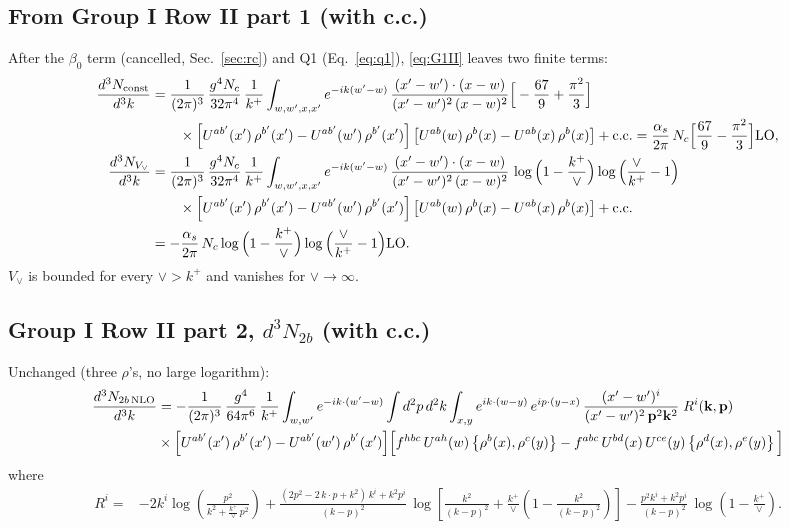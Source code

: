 \documentclass[10pt]{article}
\numberwithin{equation}{section}
\newcommand{\LO}{{\rm LO}}
\begin{document}
\subsection{From Group I Row II part 1 (with c.c.)}
After the $\beta_0$ term (cancelled, Sec.~\ref{sec:rc}) and Q1 (Eq.~\eqref{eq:q1}), \eqref{eq:G1II} leaves two finite terms:
\begin{align}
\frac{d^3N_{\rm const}}{d^3k}&=\frac{1}{(2\pi)^{3}}\,\frac{g^{4}N_{c}}{32\pi^{4}}\,\frac{1}{k^{+}}\int_{w,w',x,x'}e^{-ik(w'-w)}\,\frac{(x'-w')\cdot (x-w)}{(x'-w')^{2}\,(x-w)^{2}}\Big[-\frac{67}{9}+\frac{\pi^{2}}{3}\Big]\notag\\
&\qquad\times\left[U^{ab'}(x')\,\rho^{b'}(x') - U^{ab'}(w')\,\rho^{b'}(x')\right]\left[U^{ab}(w)\,\rho^{b}(x) - U^{ab}(x)\,\rho^{b}(x)\right]+{\rm c.c.}=\frac{\alpha_s}{2\pi}\,N_c\Big[\frac{67}{9}-\frac{\pi^2}{3}\Big]\LO,\label{eq:const}\\
\frac{d^3N_{V_\vee}}{d^3k}&=\frac{1}{(2\pi)^{3}}\,\frac{g^{4}N_{c}}{32\pi^{4}}\,\frac{1}{k^{+}}\int_{w,w',x,x'}e^{-ik(w'-w)}\,\frac{(x'-w')\cdot (x-w)}{(x'-w')^{2}\,(x-w)^{2}}\,\log\Big(1-\frac{k^{+}}{\vee}\Big)\log\Big(\frac{\vee}{k^{+}}-1\Big)\notag\\
&\qquad\times\left[U^{ab'}(x')\,\rho^{b'}(x') - U^{ab'}(w')\,\rho^{b'}(x')\right]\left[U^{ab}(w)\,\rho^{b}(x) - U^{ab}(x)\,\rho^{b}(x)\right]+{\rm c.c.}\notag\\
&=-\frac{\alpha_s}{2\pi}\,N_c\log\Big(1-\frac{k^+}{\vee}\Big)\log\Big(\frac{\vee}{k^+}-1\Big)\LO.\label{eq:Vvee}
\end{align}
$V_\vee$ is bounded for every $\vee>k^+$ and vanishes for $\vee\to\infty$.

\subsection{Group I Row II part 2, $d^3N_{2b}$ (with c.c.)}\label{sub:first}
Unchanged (three $\rho$'s, no large logarithm):
\begin{align}
\frac{d^{3}N_{2b\,\rm NLO}}{d^{3}k} & = -\frac{1}{(2\pi)^{3}}\,\frac{g^{4}}{64\pi^{6}}\,\frac{1}{k^{+}}\int_{w,w'} e^{-ik\cdot(w'-w)}
\int d^{2}p\,d^{2}k\int_{x,y} e^{ik\cdot(w-y)}\,e^{ip\cdot(y-x)}\,\frac{(x'-w')^{i}}{(x'-w')^{2}\,\mathbf{p}^{2}\mathbf{k}^{2}}\;R^{i}(\mathbf{k},\mathbf{p})\notag\\
&\times\Big[U^{ab'}(x')\,\rho^{b'}(x')-U^{ab'}(w')\,\rho^{b'}(x')\Big]
\Big[f^{hbc}\,U^{ah}(w)\left\{\rho^{b}(x),\rho^{c}(y)\right\}-f^{abc}\,U^{bd}(x)\,U^{ce}(y)\left\{\rho^{d}(x),\rho^{e}(y)\right\}\Big]
\end{align}
where
\begin{align}
R^{i} =& -2k^{i}\log\left(\frac{p^{2}}{k^{2}+\frac{k^{+}}{\vee}\,p^{2}}\right)
+\frac{(2p^{2}-2\,k\cdot p+k^{2})\,k^{i}+k^{2}p^{i}}{(k-p)^{2}}\,
\log\left[\frac{k^{2}}{(k-p)^{2}}+\frac{k^{+}}{\vee}\left(1-\frac{k^{2}}{(k-p)^{2}}\right)\right]
-\frac{p^{2}k^{i}+k^{2}p^{i}}{(k-p)^{2}}\,\log\left(1-\frac{k^{+}}{\vee}\right).
\end{align}
\end{document}
